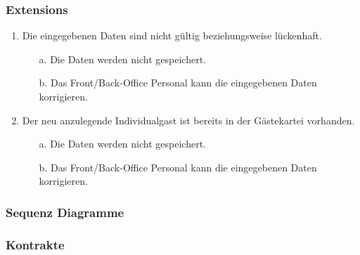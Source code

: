 \documentclass[./detailed_overview_usecases.tex]{subfiles}
\begin{document}
    \subsubsection*{Extensions}
    \begin{enumerate}
        \item Die eingegebenen Daten sind nicht gültig beziehungsweise lückenhaft.
        \begin{itemize}
                       \item[a.] Die Daten werden nicht gespeichert.
                       \item[b.] Das Front/Back-Office Personal kann die eingegebenen Daten korrigieren.
        \end{itemize}
        \item Der neu anzulegende Individualgast ist bereits in der Gästekartei vorhanden.
        \begin{itemize}
            \item[a.] Die Daten werden nicht gespeichert.
            \item[b.] Das Front/Back-Office Personal kann die eingegebenen Daten korrigieren.
        \end{itemize}
    \end{enumerate}

    \subsubsection{Sequenz Diagramme}
    \subsubsection{Kontrakte}
\end{document}

